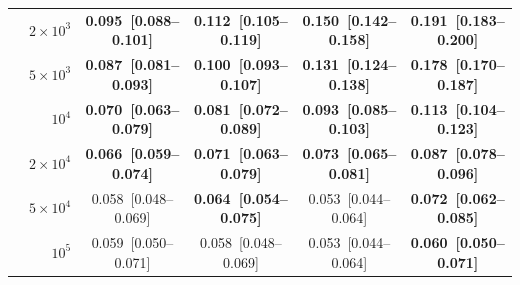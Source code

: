 {\begin{tabular}{lrcccc}
 & $2\times10^3$ & \textbf{0.095~[0.088--0.101]} & \textbf{0.112~[0.105--0.119]} & \textbf{0.150~[0.142--0.158]} & \textbf{0.191~[0.183--0.200]} \\
 & $5\times10^3$ & \textbf{0.087~[0.081--0.093]} & \textbf{0.100~[0.093--0.107]} & \textbf{0.131~[0.124--0.138]} & \textbf{0.178~[0.170--0.187]} \\
 & $10^4$ & \textbf{0.070~[0.063--0.079]} & \textbf{0.081~[0.072--0.089]} & \textbf{0.093~[0.085--0.103]} & \textbf{0.113~[0.104--0.123]} \\
 & $2\times10^4$ & \textbf{0.066~[0.059--0.074]} & \textbf{0.071~[0.063--0.079]} & \textbf{0.073~[0.065--0.081]} & \textbf{0.087~[0.078--0.096]} \\
 & $5\times10^4$ & 0.058~[0.048--0.069] & \textbf{0.064~[0.054--0.075]} & 0.053~[0.044--0.064] & \textbf{0.072~[0.062--0.085]} \\
 & $10^5$ & 0.059~[0.050--0.071] & 0.058~[0.048--0.069] & 0.053~[0.044--0.064] & \textbf{0.060~[0.050--0.071]} \\
\bottomrule
\end{tabular}}
